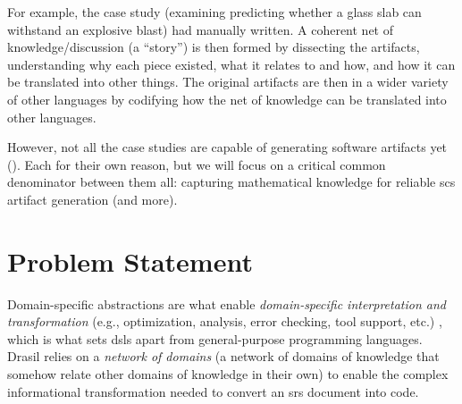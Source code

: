 For example, the  case study (examining predicting whether a glass
slab can withstand an explosive blast) had 
manually written. A coherent net of knowledge/discussion (a ``story'') is then
formed by dissecting the artifacts, understanding why each piece existed, what
it relates to and how, and how it can be translated into other things. The
original artifacts are then
in a wider variety of other languages by codifying how the net of knowledge can
be translated into other languages.

However, not all the case studies are capable of generating software artifacts
yet (). Each for their own reason, but we will focus
on a critical common denominator between them all: capturing mathematical
knowledge for reliable \acs{scs} artifact generation (and more).

\section{Problem Statement}
\label{sec:intro:problemStatement}

\iffalse
      Drasil has de-duplicated knowledge across \acs{scs} artifacts relevant to
      specifications and code. Through codifying knowledge and creating coherent
      ``stories'', Drasil is able to generate a wide variety of software
      artifacts (e.g., \acs{oo} programs via \acs{gool} with guided usage via
      Makefiles, and requirements specifications [HTML and TeX]). This codified
      knowledge was de-duplicated from an originating set of artifacts via
      bottom-up gathering, however, we should be able to use the same knowledge
      to generate more artifacts in different languages, flavours, and with more
      options. However, each desired artifact language has its own way of
      encoding information (such as mathematical expressions). This leaves us
      needing to teach Drasil more about the targeted languages (and, at times,
      about the existing codified knowledge) in order to reliably generate
      usable artifacts.
\fi

Domain-specific abstractions are what enable \textit{domain-specific
      interpretation and transformation} (e.g., optimization, analysis, error
checking, tool support, etc.) \cite{Czarnecki2005}, which is what sets
\acsp{dsl} apart from general-purpose programming languages. Drasil relies on a
\textit{network of domains} (a network of domains of knowledge that somehow
relate other domains of knowledge in their own) to enable the complex
informational transformation needed to convert an \acs{srs} document into code.

